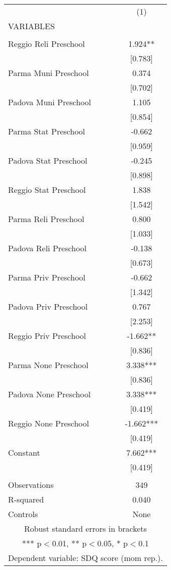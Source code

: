 \begin{tabular}{lc} \hline
 & (1) \\
VARIABLES &  \\ \hline
 &  \\
Reggio Reli Preschool & 1.924** \\
 & [0.783] \\
Parma Muni Preschool & 0.374 \\
 & [0.702] \\
Padova Muni Preschool & 1.105 \\
 & [0.854] \\
Parma Stat Preschool & -0.662 \\
 & [0.959] \\
Padova Stat Preschool & -0.245 \\
 & [0.898] \\
Reggio Stat Preschool & 1.838 \\
 & [1.542] \\
Parma Reli Preschool & 0.800 \\
 & [1.033] \\
Padova Reli Preschool & -0.138 \\
 & [0.673] \\
Parma Priv Preschool & -0.662 \\
 & [1.342] \\
Padova Priv Preschool & 0.767 \\
 & [2.253] \\
Reggio Priv Preschool & -1.662** \\
 & [0.836] \\
Parma None Preschool & 3.338*** \\
 & [0.836] \\
Padova None Preschool & 3.338*** \\
 & [0.419] \\
Reggio None Preschool & -1.662*** \\
 & [0.419] \\
Constant & 7.662*** \\
 & [0.419] \\
 &  \\
Observations & 349 \\
R-squared & 0.040 \\
 Controls & None \\ \hline
\multicolumn{2}{c}{ Robust standard errors in brackets} \\
\multicolumn{2}{c}{ *** p$<$0.01, ** p$<$0.05, * p$<$0.1} \\
\multicolumn{2}{c}{ Dependent variable: SDQ score (mom rep.).} \\
\end{tabular}
